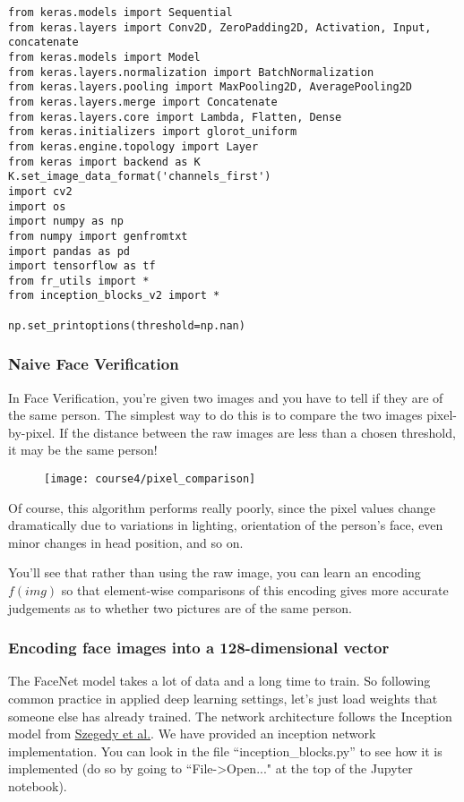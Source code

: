 \begin{verbatim}
from keras.models import Sequential
from keras.layers import Conv2D, ZeroPadding2D, Activation, Input, concatenate
from keras.models import Model
from keras.layers.normalization import BatchNormalization
from keras.layers.pooling import MaxPooling2D, AveragePooling2D
from keras.layers.merge import Concatenate
from keras.layers.core import Lambda, Flatten, Dense
from keras.initializers import glorot_uniform
from keras.engine.topology import Layer
from keras import backend as K
K.set_image_data_format('channels_first')
import cv2
import os
import numpy as np
from numpy import genfromtxt
import pandas as pd
import tensorflow as tf
from fr_utils import *
from inception_blocks_v2 import *

np.set_printoptions(threshold=np.nan)
\end{verbatim}


\subsubsection{Naive Face Verification}
In Face Verification, you're given two images and you have to tell if they are of the same person. The simplest way to do this is to compare the two images pixel-by-pixel. If the distance between the raw images are less than a chosen threshold, it may be the same person!
\begin{figure}[h]
\begin{center}
\texttt{[image: course4/pixel\_comparison]}
\end{center}
\end{figure}

Of course, this algorithm performs really poorly, since the pixel values change dramatically due to variations in lighting, orientation of the person's face, even minor changes in head position, and so on. 

You'll see that rather than using the raw image, you can learn an encoding $f(img)$ so that element-wise comparisons of this encoding gives more accurate judgements as to whether two pictures are of the same person.


\subsubsection{Encoding face images into a 128-dimensional vector}


The FaceNet model takes a lot of data and a long time to train. So following common practice in applied deep learning settings, let's just load weights that someone else has already trained. The network architecture follows the Inception model from \href{https://arxiv.org/abs/1409.4842}{Szegedy et al.}. We have provided an inception network implementation. You can look in the file ``inception\_blocks.py'' to see how it is implemented (do so by going to ``File->Open..." at the top of the Jupyter notebook).  

